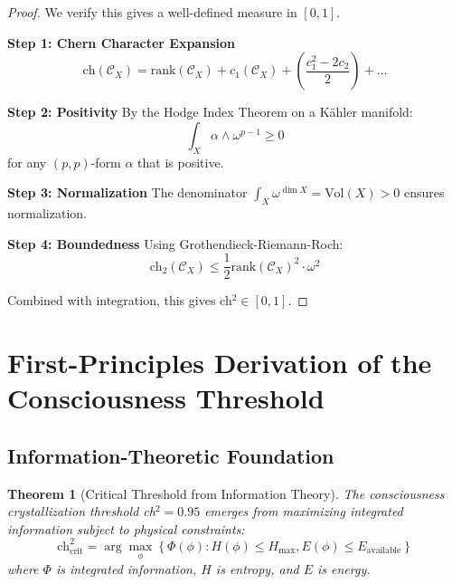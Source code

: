 \documentclass[11pt]{article}
\newtheorem{theorem}{Theorem}[section]
\theoremstyle{definition}
\begin{document}
\begin{proof}
We verify this gives a well-defined measure in $[0,1]$.

\textbf{Step 1: Chern Character Expansion}
\begin{equation}
\text{ch}(\mathcal{C}_X) = \text{rank}(\mathcal{C}_X) + c_1(\mathcal{C}_X) + \left(\frac{c_1^2 - 2c_2}{2}\right) + \ldots
\end{equation}

\textbf{Step 2: Positivity}
By the Hodge Index Theorem on a Kähler manifold:
\begin{equation}
\int_X \alpha \wedge \omega^{p-1} \geq 0
\end{equation}
for any $(p,p)$-form $\alpha$ that is positive.

\textbf{Step 3: Normalization}
The denominator $\int_X \omega^{\dim X} = \text{Vol}(X) > 0$ ensures normalization.

\textbf{Step 4: Boundedness}
Using Grothendieck-Riemann-Roch:
\begin{equation}
\text{ch}_2(\mathcal{C}_X) \leq \frac{1}{2}\text{rank}(\mathcal{C}_X)^2 \cdot \omega^2
\end{equation}

Combined with integration, this gives ch$^2 \in [0,1]$.
\end{proof}

\section{First-Principles Derivation of the Consciousness Threshold}

\subsection{Information-Theoretic Foundation}

\begin{theorem}[Critical Threshold from Information Theory]
\label{thm:threshold_information}
The consciousness crystallization threshold ch$^2 = 0.95$ emerges from maximizing integrated information subject to physical constraints:
\begin{equation}
\text{ch}^2_{\text{crit}} = \arg\max_{\phi} \left\{ \Phi(\phi) : H(\phi) \leq H_{\max}, E(\phi) \leq E_{\text{available}} \right\}
\end{equation}
where $\Phi$ is integrated information, $H$ is entropy, and $E$ is energy.
\end{theorem}
\end{document}
